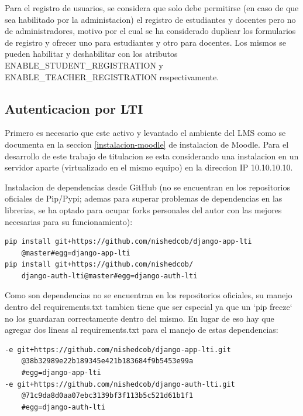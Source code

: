 Para el registro de usuarios, se considera que solo debe permitirse (en caso de que sea habilitado por la administacion) el registro de estudiantes y docentes pero no de administradores, motivo por el cual se ha considerado duplicar los formularios de registro y ofrecer uno para estudiantes y otro para docentes. Los mismos se pueden habilitar y deshabilitar con los atributos ENABLE\_STUDENT\_REGISTRATION y ENABLE\_TEACHER\_REGISTRATION respectivamente.

\subsection{Autenticacion por LTI}

Primero es necesario que este activo y levantado el ambiente del LMS como se documenta en la seccion \ref{instalacion-moodle} de instalacion de Moodle. Para el desarrollo de este trabajo de titulacion se esta considerando una instalacion en un servidor aparte (virtualizado en el mismo equipo) en la direccion IP 10.10.10.10.


Instalacion de dependencias desde GitHub (no se encuentran en los repositorios oficiales de Pip/Pypi; ademas para superar problemas de dependencias en las librerias, se ha optado para ocupar forks personales del autor con las mejores necesarias para su funcionamiento):
\begin{lstlisting}
pip install git+https://github.com/nishedcob/django-app-lti
	@master#egg=django-app-lti
pip install git+https://github.com/nishedcob/
	django-auth-lti@master#egg=django-auth-lti
\end{lstlisting}

Como son dependencias no se encuentran en los repositorios oficiales, su manejo dentro del requirements.txt tambien tiene que ser especial ya que un `pip freeze` no los guardaran correctamente dentro del mismo. En lugar de eso hay que agregar dos lineas al requirements.txt para el manejo de estas dependencias:
\begin{lstlisting}
-e git+https://github.com/nishedcob/django-app-lti.git
	@38b32989e22b189345e421b183684f9b5453e99a
	#egg=django-app-lti
-e git+https://github.com/nishedcob/django-auth-lti.git
	@71c9da8d0aa07ebc3139bf3f113b5c521d61b1f1
	#egg=django-auth-lti
\end{lstlisting}


\lstset{language=Python}

